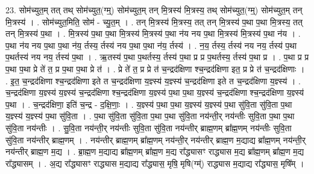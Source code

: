\documentclass[17pt]{extarticle}
\begin{document}
23. सोम॑च्युत॒म् तत् तथ् सोम॑च्युत॒(ग्म्॒) सोम॑च्युत॒म् तन् मि॒त्रस्य॑ मि॒त्रस्य॒ तथ् सोम॑च्युत॒(ग्म्॒) सोम॑च्युत॒म् तन् मि॒त्रस्य॑ । . सोम॑च्युत॒मिति॒ सोम॑ - च्यु॒त॒म् । . तन् मि॒त्रस्य॑ मि॒त्रस्य॒ तत् तन् मि॒त्रस्य॑ प॒था प॒था मि॒त्रस्य॒ तत् तन् मि॒त्रस्य॑ प॒था । . मि॒त्रस्य॑ प॒था प॒था मि॒त्रस्य॑ मि॒त्रस्य॑ प॒था न॑य नय प॒था मि॒त्रस्य॑ मि॒त्रस्य॑ प॒था न॑य । . प॒था न॑य नय प॒था प॒था न॑य॒ र्तस्य॒ र्तस्य॑ नय प॒था प॒था न॑य॒ र्तस्य॑ । . न॒य॒ र्तस्य॒ र्तस्य॑ नय नय॒ र्तस्य॑ प॒था प॒थर्तस्य॑ नय नय॒ र्तस्य॑ प॒था । . ऋ॒तस्य॑ प॒था प॒थर्तस्य॒ र्तस्य॑ प॒था प्र प्र प॒थर्तस्य॒ र्तस्य॑ प॒था प्र । . प॒था प्र प्र प॒था प॒था प्रे ते॑ त॒ प्र प॒था प॒था प्रे त॑ । . प्रे ते॑ त॒ प्र प्रे त॑ च॒न्द्रद॑क्षिणा श्च॒न्द्रद॑क्षिणा इत॒ प्र प्रे त॑ च॒न्द्रद॑क्षिणाः । . इ॒त॒ च॒न्द्रद॑क्षिणा श्च॒न्द्रद॑क्षिणा इते त च॒न्द्रद॑क्षिणा य॒ज्ञ्स्य॑ य॒ज्ञ्स्य॑ च॒न्द्रद॑क्षिणा इते त च॒न्द्रद॑क्षिणा य॒ज्ञ्स्य॑ । . च॒न्द्रद॑क्षिणा य॒ज्ञ्स्य॑ य॒ज्ञ्स्य॑ च॒न्द्रद॑क्षिणा श्च॒न्द्रद॑क्षिणा य॒ज्ञ्स्य॑ प॒था प॒था य॒ज्ञ्स्य॑ च॒न्द्रद॑क्षिणा श्च॒न्द्रद॑क्षिणा य॒ज्ञ्स्य॑ प॒था । . च॒न्द्रद॑क्षिणा॒ इति॑ च॒न्द्र - द॒क्षि॒णाः॒ । . य॒ज्ञ्स्य॑ प॒था प॒था य॒ज्ञ्स्य॑ य॒ज्ञ्स्य॑ प॒था सु॑वि॒ता सु॑वि॒ता प॒था य॒ज्ञ्स्य॑ य॒ज्ञ्स्य॑ प॒था सु॑वि॒ता । . प॒था सु॑वि॒ता सु॑वि॒ता प॒था प॒था सु॑वि॒ता नय॑न्ती॒र् नय॑न्तीः सुवि॒ता प॒था प॒था सु॑वि॒ता नय॑न्तीः । . सु॒वि॒ता नय॑न्ती॒र् नय॑न्तीः सुवि॒ता सु॑वि॒ता नय॑न्तीर् ब्राह्म॒णम् ब्रा᳚ह्म॒णम् नय॑न्तीः सुवि॒ता सु॑वि॒ता 
नय॑न्तीर् ब्राह्म॒णम् । . नय॑न्तीर् ब्राह्म॒णम् ब्रा᳚ह्म॒णम् नय॑न्ती॒र् नय॑न्तीर् ब्राह्म॒ण म॒द्याद्य ब्रा᳚ह्म॒णम् नय॑न्ती॒र् नय॑न्तीर् ब्राह्म॒ण म॒द्य । . ब्रा॒ह्म॒ण म॒द्याद्य ब्रा᳚ह्म॒णम् ब्रा᳚ह्म॒ण म॒द्य रा᳚द्ध्यासꣳ राद्ध्यास म॒द्य ब्रा᳚ह्म॒णम् ब्रा᳚ह्म॒ण म॒द्य रा᳚द्ध्यासम् । . अ॒द्य रा᳚द्ध्यासꣳ राद्ध्यास म॒द्याद्य रा᳚द्ध्यास॒ मृषि॒ मृषि(ग्म्॑) राद्ध्यास म॒द्याद्य रा᳚द्ध्यास॒ मृषि᳚म् । \newline
\end{document}
